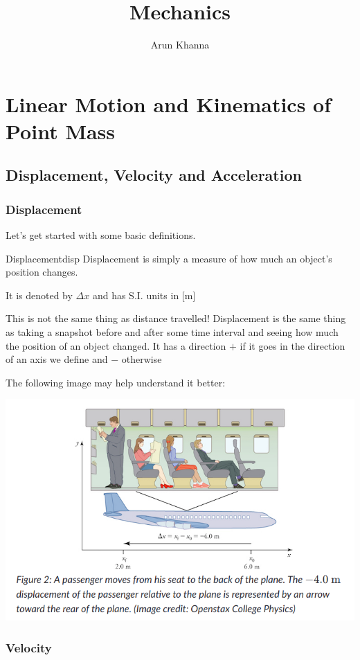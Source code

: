 \documentclass{report}
\title{Mechanics}
\author{Arun Khanna}
\date{}
\begin{document}
\maketitle
\tableofcontents

\chapter{Linear Motion and Kinematics of Point Mass}
\section{Displacement, Velocity and Acceleration}
\subsection{Displacement}
Let's get started with some basic definitions.
\begin{mytheo}{Displacement}{disp}
    Displacement is simply a measure of how much an object's position changes.
    
    It is denoted by $\Delta x$ and has S.I. units in [m]
\end{mytheo}

This is not the same thing as distance travelled! Displacement is the same thing as taking a snapshot before and after some time interval and seeing how much the position of an object changed. It has a direction $+$ if it goes in the direction of an axis we define and $-$ otherwise

The following image may help understand it better:

\includegraphics[scale=0.5]{displacement.png}

\subsection{Velocity}
\end{document}
